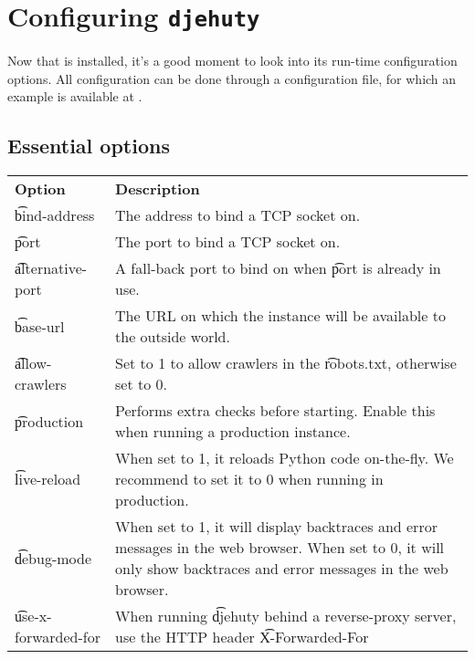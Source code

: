 \chapter{Configuring \texttt{djehuty}}
\label{chap:configuring-djehuty}
Now that  is installed, it's a good moment to look into its
run-time configuration options.  All configuration can be done through a
configuration file, for which an example is available at
.

\section{Essential options}
\label{sec:essential-options}

\begin{tabularx}{\textwidth}{*{1}{!{\VRule[-1pt]}l}!{\VRule[-1pt]}X}
  \headrow
  \textbf{Option}            & \textbf{Description}\\
  \t{bind-address}           & The address to bind a TCP socket on.\\
  \t{port}                   & The port to bind a TCP socket on.\\
  \t{alternative-port}       & A fall-back port to bind on when \t{port} is
                               already in use.\\
  \t{base-url}               & The URL on which the instance will be available
                               to the outside world.\\
  \t{allow-crawlers}         & Set to 1 to allow crawlers in the \t{robots.txt},
                               otherwise set to 0.\\
  \t{production}             & Performs extra checks before starting. Enable
                               this when running a production instance.\\
  \t{live-reload}            & When set to 1, it reloads Python code on-the-fly.
                               We recommend to set it to 0 when running in
                               production.\\
  \t{debug-mode}             & When set to 1, it will display backtraces and
                               error messages in the web browser. When set to 0,
                               it will only show backtraces and error messages
                               in the web browser.\\
  \t{use-x-forwarded-for}    & When running \t{djehuty} behind a reverse-proxy
                               server, use the HTTP header \t{X-Forwarded-For}

\end{tabularx}
